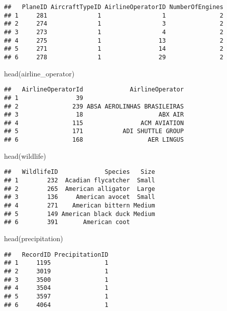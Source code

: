 \documentclass[
]{article}
\newenvironment{Shaded}{\begin{snugshade}}{\end{snugshade}}
\newcommand{\FunctionTok}[1]{\textcolor[rgb]{0.00,0.00,0.00}{#1}}
\newcommand{\NormalTok}[1]{#1}
\begin{document}
\begin{verbatim}
##   PlaneID AircraftTypeID AirlineOperatorID NumberOfEngines
## 1     281              1                 1               2
## 2     274              1                 3               2
## 3     273              1                 4               2
## 4     275              1                13               2
## 5     271              1                14               2
## 6     278              1                29               2
\end{verbatim}

\begin{Shaded}
\begin{Highlighting}[]
\FunctionTok{head}\NormalTok{(airline\_operator)}
\end{Highlighting}
\end{Shaded}

\begin{verbatim}
##   AirlineOperatorId             AirlineOperator
## 1                39                            
## 2               239 ABSA AEROLINHAS BRASILEIRAS
## 3                18                     ABX AIR
## 4               115                ACM AVIATION
## 5               171           ADI SHUTTLE GROUP
## 6               168                  AER LINGUS
\end{verbatim}

\begin{Shaded}
\begin{Highlighting}[]
\FunctionTok{head}\NormalTok{(wildlife)}
\end{Highlighting}
\end{Shaded}

\begin{verbatim}
##   WildlifeID             Species   Size
## 1        232  Acadian flycatcher  Small
## 2        265  American alligator  Large
## 3        136     American avocet  Small
## 4        271    American bittern Medium
## 5        149 American black duck Medium
## 6        391       American coot
\end{verbatim}

\begin{Shaded}
\begin{Highlighting}[]
\FunctionTok{head}\NormalTok{(precipitation)}
\end{Highlighting}
\end{Shaded}

\begin{verbatim}
##   RecordID PrecipitationID
## 1     1195               1
## 2     3019               1
## 3     3500               1
## 4     3504               1
## 5     3597               1
## 6     4064               1
\end{verbatim}
\end{document}

